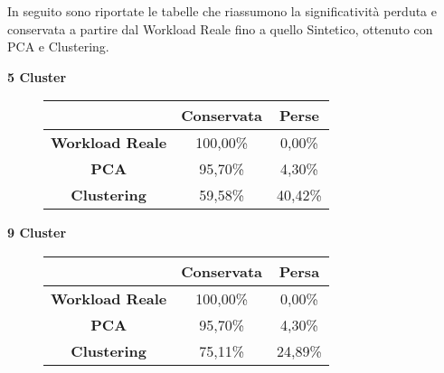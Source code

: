 \clearpage

In seguito sono riportate le tabelle che riassumono la significatività perduta e
conservata a partire dal Workload Reale fino a quello Sintetico, ottenuto con
PCA e Clustering.\\

\vspace{5 mm}
\begin{center}
  \textbf{5 Cluster}
\end{center}
\begin{figure}[!htbp]
  \centering
  \begin{tabular}{c|c|c}
   & \textbf{Conservata} & \textbf{Perse} \\
   \hline
   \textbf{Workload Reale} & 100,00\% &	0,00\% \\
   \hline
   \textbf{PCA} &	95,70\%	& 4,30\% \\
   \hline
   \textbf{Clustering} &	59,58\%	& 40,42\% \\
  \end{tabular}
\end{figure}

\vspace{5 mm}
\begin{center}
  \textbf{9 Cluster}
\end{center}
\begin{figure}[!htbp]
  \centering
  \begin{tabular}{c|c|c}
   & \textbf{Conservata} & \textbf{Persa} \\
   \hline
   \textbf{Workload Reale} & 100,00\% &	0,00\% \\
   \hline
   \textbf{PCA} &	95,70\%	& 4,30\% \\
   \hline
   \textbf{Clustering} &	75,11\%	& 24,89\% \\
  \end{tabular}
\end{figure}

\vspace{5 mm}

